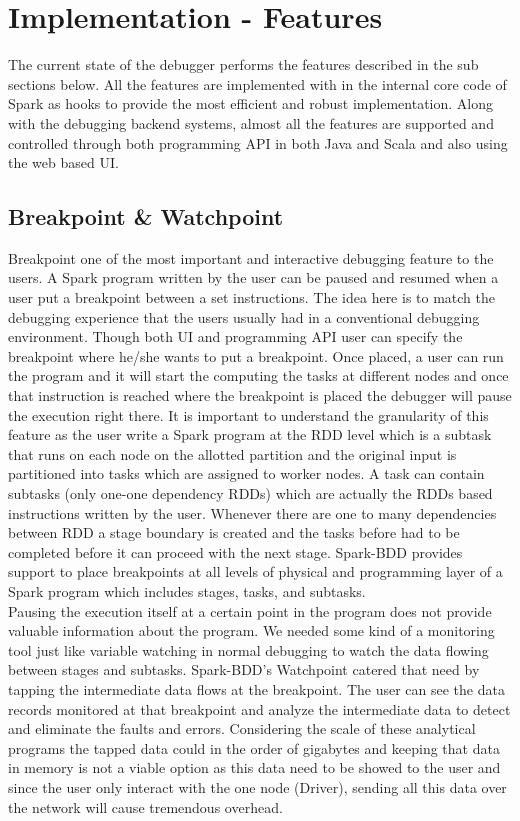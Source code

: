 \documentclass{acm_proc_article-sp}
\begin{document}
\section{Implementation - Features}
The current state of the debugger performs the features described in the sub sections below. All the features are implemented with in the internal core code of Spark as hooks to provide the most efficient and robust implementation. Along with the debugging backend systems, almost all the features are supported and controlled through both programming API in both Java and Scala and also using the web based UI.


\subsection{Breakpoint \& Watchpoint}
Breakpoint one of the most important and interactive debugging feature to the users. A Spark program written by the user can be paused and resumed when a user put a breakpoint between a set instructions. The idea here is to match the debugging experience that the users usually had in a conventional debugging environment. Though both UI and programming API user can specify the breakpoint where he/she wants to put a breakpoint. Once placed, a user can run the program and it will start the computing the tasks at different nodes and once that instruction is reached where the breakpoint is placed the debugger will pause the execution right there. It is important to understand the granularity of this feature as the user write a Spark program at the RDD level which is a subtask that runs on each node on the allotted partition and the original input is partitioned into tasks which are assigned to worker nodes. A task can contain subtasks (only one-one dependency RDDs) which are actually the RDDs based instructions written by the user. Whenever there are one to many dependencies between RDD a stage boundary is created and the tasks before had to be completed before it can proceed with the next stage. Spark-BDD provides support to place breakpoints at all levels of physical and programming layer of a Spark program which includes stages, tasks, and subtasks.\\
Pausing the execution itself at a certain point in the program does not provide valuable information about the program. We needed some kind of a monitoring tool just like variable watching in normal debugging to watch the data flowing between stages and subtasks. Spark-BDD's Watchpoint catered that need by tapping the intermediate data flows at the breakpoint. The user can see the data records monitored at that breakpoint and analyze the intermediate data to detect and eliminate the faults and errors. Considering the scale of these analytical programs the tapped data could in the order of gigabytes and keeping that data in memory is not a viable option as this data need to be showed to the user and since the user only interact with the one node (Driver), sending all this data over the network will cause tremendous overhead. \\
\end{document}
